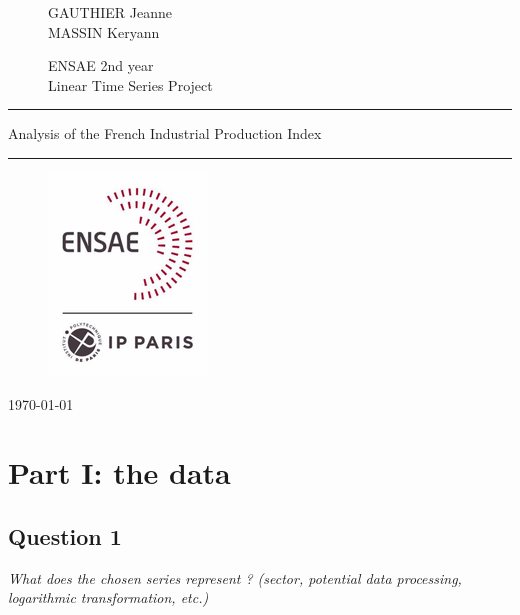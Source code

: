 \documentclass[]{article}
\begin{document}
	
\thispagestyle{plain}
\begin{figure}[!h]
	\centering
	\begin{minipage}{0.45 \linewidth}
		\centering
		\LARGE{GAUTHIER Jeanne}\\
		\LARGE{MASSIN Keryann}
	\end{minipage}
	\hfill
	\begin{minipage}{0.48 \linewidth}
		\centering
		\Large{ENSAE 2nd year}\\
		\Large{Linear Time Series Project}		
	\end{minipage}
\end{figure}

\bigskip
\bigskip
\bigskip
\bigskip
\bigskip
\bigskip

\hrule
\begin{center}
	\Huge{Analysis of the French Industrial Production Index}
\end{center}
\hrule

\bigskip
\bigskip

\begin{figure}[h!]
	\centering
	\includegraphics[scale=0.6]{ENSAE_logo.png}
\end{figure}
\bigskip
\bigskip
\bigskip
\begin{center}
	\today
\end{center}

\newpage
\tableofcontents

\newpage
\section{Part I: the data}
\subsection{Question 1}
\textit{What does the chosen series represent ? (sector, potential data processing, logarithmic transformation, etc.)}\\
\end{document}

